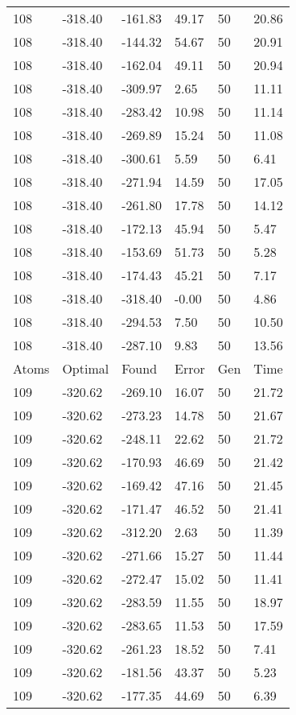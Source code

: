 \documentclass{report}
\begin{document}
\begin{appendix}
\begin{longtable}{llllll}
108 & -318.40 & -161.83 & 49.17 & 50 & 20.86 \\
108 & -318.40 & -144.32 & 54.67 & 50 & 20.91 \\
108 & -318.40 & -162.04 & 49.11 & 50 & 20.94 \\
108 & -318.40 & -309.97 & 2.65 & 50 & 11.11 \\
108 & -318.40 & -283.42 & 10.98 & 50 & 11.14 \\
108 & -318.40 & -269.89 & 15.24 & 50 & 11.08 \\
108 & -318.40 & -300.61 & 5.59 & 50 & 6.41 \\
108 & -318.40 & -271.94 & 14.59 & 50 & 17.05 \\
108 & -318.40 & -261.80 & 17.78 & 50 & 14.12 \\
108 & -318.40 & -172.13 & 45.94 & 50 & 5.47 \\
108 & -318.40 & -153.69 & 51.73 & 50 & 5.28 \\
108 & -318.40 & -174.43 & 45.21 & 50 & 7.17 \\
108 & -318.40 & -318.40 & -0.00 & 50 & 4.86 \\
108 & -318.40 & -294.53 & 7.50 & 50 & 10.50 \\
108 & -318.40 & -287.10 & 9.83 & 50 & 13.56 \\
Atoms & Optimal & Found & Error & Gen & Time \\
109 & -320.62 & -269.10 & 16.07 & 50 & 21.72 \\
109 & -320.62 & -273.23 & 14.78 & 50 & 21.67 \\
109 & -320.62 & -248.11 & 22.62 & 50 & 21.72 \\
109 & -320.62 & -170.93 & 46.69 & 50 & 21.42 \\
109 & -320.62 & -169.42 & 47.16 & 50 & 21.45 \\
109 & -320.62 & -171.47 & 46.52 & 50 & 21.41 \\
109 & -320.62 & -312.20 & 2.63 & 50 & 11.39 \\
109 & -320.62 & -271.66 & 15.27 & 50 & 11.44 \\
109 & -320.62 & -272.47 & 15.02 & 50 & 11.41 \\
109 & -320.62 & -283.59 & 11.55 & 50 & 18.97 \\
109 & -320.62 & -283.65 & 11.53 & 50 & 17.59 \\
109 & -320.62 & -261.23 & 18.52 & 50 & 7.41 \\
109 & -320.62 & -181.56 & 43.37 & 50 & 5.23 \\
109 & -320.62 & -177.35 & 44.69 & 50 & 6.39 \\

\end{longtable}
\end{appendix}
\end{document}
